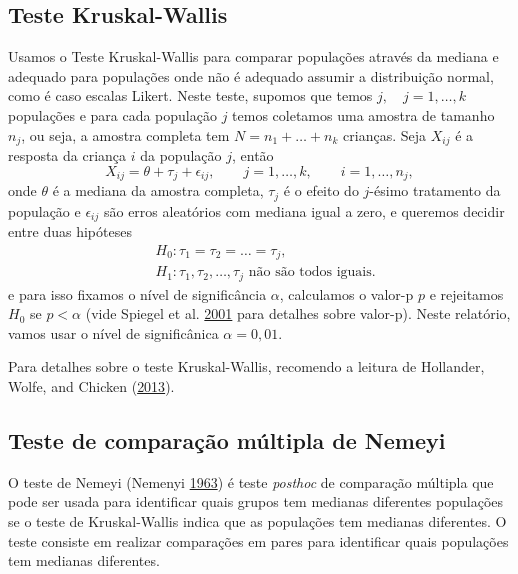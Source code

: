 \documentclass[]{article}
\begin{document}
\hypertarget{teste-kruskal-wallis}{%
\subsection{Teste Kruskal-Wallis}\label{teste-kruskal-wallis}}

Usamos o Teste Kruskal-Wallis para comparar populações através da mediana e adequado para populações onde não é adequado assumir a distribuição normal, como é caso escalas Likert. Neste teste, supomos que temos \(j,\quad j=1, \dots, k\) populações e para cada população \(j\) temos coletamos uma amostra de tamanho \(n_j\), ou seja, a amostra completa tem \(N = n_1 + \dots + n_k\) crianças. Seja \(X_{ij}\) é a resposta da criança \(i\) da população \(j\), então
\[
X_{ij} = \theta + \tau_j + \epsilon_{ij}, \qquad  j=1, \dots, k,\qquad i=1, \dots, n_j,
\]
onde \(\theta\) é a mediana da amostra completa, \(\tau_j\) é o efeito do \(j\)-ésimo tratamento da população e \(\epsilon_{ij}\) são erros aleatórios com mediana igual a zero, e queremos decidir entre duas hipóteses
\[
\begin{split}
&H_0: \tau_1 = \tau_2 = \dots = \tau_j,\\
&H_1: \tau_1, \tau_2, \dots,  \tau_j \mbox{ não são todos iguais}.
\end{split}
\]
e para isso fixamos o nível de significância \(\alpha\), calculamos o valor-p \(p\) e rejeitamos \(H_0\) se \(p < \alpha\) (vide Spiegel et al. \protect\hyperlink{ref-spiegel2001probability}{2001} para detalhes sobre valor-p). Neste relatório, vamos usar o nível de significânica \(\alpha=0,01\).

Para detalhes sobre o teste Kruskal-Wallis, recomendo a leitura de Hollander, Wolfe, and Chicken (\protect\hyperlink{ref-hollander2013nonparametric}{2013}).

\hypertarget{teste-de-comparauxe7uxe3o-muxfaltipla-de-nemeyi}{%
\subsection{Teste de comparação múltipla de Nemeyi}\label{teste-de-comparauxe7uxe3o-muxfaltipla-de-nemeyi}}

O teste de Nemeyi (Nemenyi \protect\hyperlink{ref-nemenyi1963distribution}{1963}) é teste \emph{posthoc} de comparação múltipla que pode ser usada para identificar quais grupos tem medianas diferentes populações se o teste de Kruskal-Wallis indica que as populações tem medianas diferentes. O teste consiste em realizar comparações em pares para identificar quais populações tem medianas diferentes.
\end{document}
